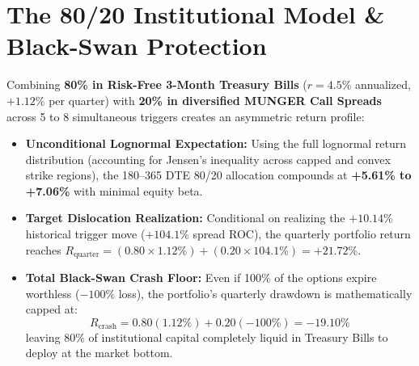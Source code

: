 \documentclass[10pt,twocolumn]{article}
\begin{document}
\begin{table}[h!]
\centering
\caption{Terminal Return on Capital (ROC) Across Scenarios (90 DTE, Skew-Adjusted)}
\label{tab:scenarios}
\end{table}

\section{The 80/20 Institutional Model \& Black-Swan Protection}
Combining \textbf{80\% in Risk-Free 3-Month Treasury Bills} ($r = 4.5\%$ annualized, $+1.12\%$ per quarter) with \textbf{20\% in diversified MUNGER Call Spreads} across 5 to 8 simultaneous triggers creates an asymmetric return profile:
\begin{itemize}
    \item \textbf{Unconditional Lognormal Expectation:} Using the full lognormal return distribution (accounting for Jensen's inequality across capped and convex strike regions), the 180--365 DTE 80/20 allocation compounds at \textbf{+5.61\% to +7.06\%} with minimal equity beta.
    \item \textbf{Target Dislocation Realization:} Conditional on realizing the $+10.14\%$ historical trigger move ($+104.1\%$ spread ROC), the quarterly portfolio return reaches $R_{\text{quarter}} = (0.80 \times 1.12\%) + (0.20 \times 104.1\%) = \mathbf{+21.72\%}$.
    \item \textbf{Total Black-Swan Crash Floor:} Even if 100\% of the options expire worthless ($-100\%$ loss), the portfolio's quarterly drawdown is mathematically capped at:
    \begin{equation}
        R_{\text{crash}} = 0.80(1.12\%) + 0.20(-100\%) = \mathbf{-19.10\%}
    \end{equation}
    leaving 80\% of institutional capital completely liquid in Treasury Bills to deploy at the market bottom.
\end{itemize}
\end{document}
